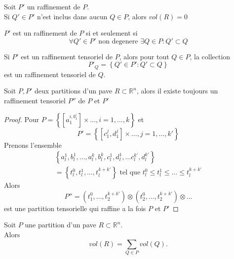 \documentclass[../main.tex]{subfiles}
\begin{document}
\begin{rmq}
Soit $P'$ un raffinement de $P$.\\
Si $Q' \in P'$ n'est inclus dans aucun $Q \in P$, alors $vol( R) =0$
\end{rmq}
\begin{rmq}
$P'$ est un raffinement de $P$ si et seulement si
\[ 
\forall Q' \in P' \text{ non degenere } \exists Q \in P: Q' \subset Q
\]

\end{rmq}
\begin{rmq}
Si $P'$ est un raffinement tensoriel de $P$, alors pour tout $Q \in P$, la collection 
\[ 
P'_Q = \left\{ Q' \in P': Q' \subset Q \right\} 
\]
est un raffinement tensoriel de $Q$.
\end{rmq}
\begin{lemma}
Soit $P,P'$ deux partitions d'un pave $R \subset \mathbb{R}^n$, alors il existe toujours un raffinement tensoriel $P''$ de $P$ et $P'$
\end{lemma}
\begin{proof}
Pour $P = \left\{  [ a_1^{i, b_1^{i}}] \times \ldots, i = 1, \ldots, k \right\} $ et 
\[ 
P' = \left\{ [ c_1^{j}, d_1^{j}] \times \ldots, j = 1, \ldots, k' \right\}
\]
Prenons l'ensemble
\begin{align*}
\left\{ a_l^{1}, b_l^{1}, \ldots, a_l^{k}, b_l^{k}, c_l^{1}, d_l^{1}, \ldots c_l^{k'}, d_l^{k'}  \right\} \\
= \left\{ t_l^{0}, t_l^{1}, \ldots, t_l ^{k+k'} \right\} \text{ tel que } t_l^{0} \leq t_l^{1} \leq  \ldots \leq t_l^{k+k'}
\end{align*}
Alors
\[ 
	P'' = ( t_1^{0}, \ldots, t_2^{k+k'}) \otimes ( t_2^{0}, \ldots, t_2^{k+k'}) \otimes \ldots
\]
est une partition tensorielle qui raffine a la fois $P$ et $P'$
\end{proof}
\begin{lemma}
Soit $P$ une partition d'un pave $R \subset \mathbb{R}^n$.\\
Alors 
\[ 
	vol ( R ) = \sum_{Q \in P}  vol( Q) .
\]

\end{lemma}
\end{document}
